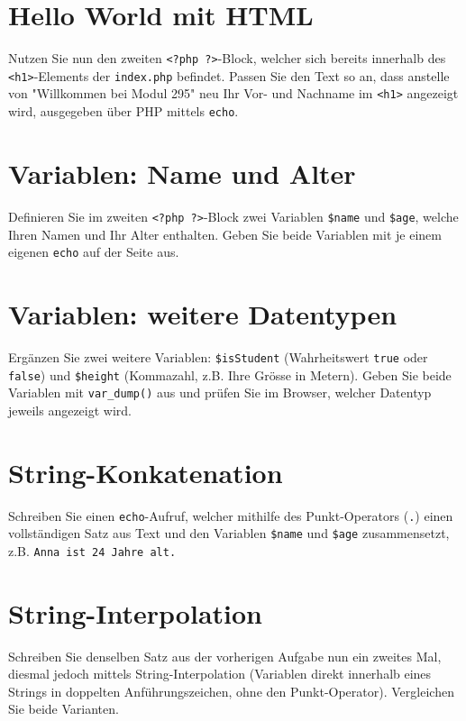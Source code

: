 \documentclass[a4paper,12pt]{article}
\begin{document}
\section{Hello World mit HTML}

Nutzen Sie nun den zweiten \texttt{<?php ?>}-Block, welcher sich bereits innerhalb des \texttt{<h1>}-Elements der \texttt{index.php} befindet. Passen Sie den Text so an, dass anstelle von "Willkommen bei Modul 295" neu Ihr Vor- und Nachname im \texttt{<h1>} angezeigt wird, ausgegeben über PHP mittels \texttt{echo}.

\section{Variablen: Name und Alter}

Definieren Sie im zweiten \texttt{<?php ?>}-Block zwei Variablen \texttt{\$name} und \texttt{\$age}, welche Ihren Namen und Ihr Alter enthalten. Geben Sie beide Variablen mit je einem eigenen \texttt{echo} auf der Seite aus.

\section{Variablen: weitere Datentypen}

Ergänzen Sie zwei weitere Variablen: \texttt{\$isStudent} (Wahrheitswert \texttt{true} oder \texttt{false}) und \texttt{\$height} (Kommazahl, z.B. Ihre Grösse in Metern). Geben Sie beide Variablen mit \texttt{var\_dump()} aus und prüfen Sie im Browser, welcher Datentyp jeweils angezeigt wird.

\section{String-Konkatenation}

Schreiben Sie einen \texttt{echo}-Aufruf, welcher mithilfe des Punkt-Operators (\texttt{.}) einen vollständigen Satz aus Text und den Variablen \texttt{\$name} und \texttt{\$age} zusammensetzt, z.B. \texttt{Anna ist 24 Jahre alt.}

\section{String-Interpolation}

Schreiben Sie denselben Satz aus der vorherigen Aufgabe nun ein zweites Mal, diesmal jedoch mittels String-Interpolation (Variablen direkt innerhalb eines Strings in doppelten Anführungszeichen, ohne den Punkt-Operator). Vergleichen Sie beide Varianten.
\end{document}
